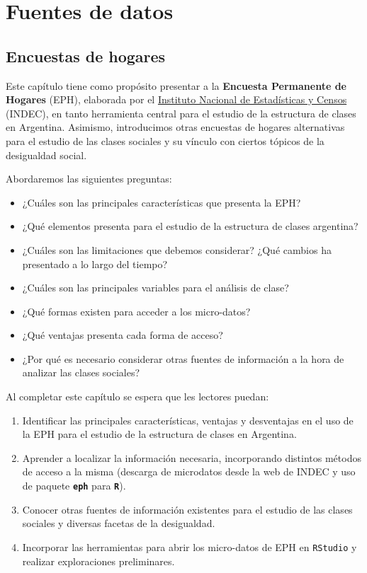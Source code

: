 \documentclass[
]{book}
\providecommand{\tightlist}{%
  \setlength{\itemsep}{0pt}\setlength{\parskip}{0pt}}
\begin{document}
\hypertarget{part-fuentes-de-datos}{%
\part{Fuentes de datos}\label{part-fuentes-de-datos}}

\hypertarget{fuentes}{%
\chapter{Encuestas de hogares}\label{fuentes}}

Este capítulo tiene como propósito presentar a la \textbf{Encuesta Permanente de Hogares} (EPH), elaborada por el \href{www.indec.gob.ar}{Instituto Nacional de Estadísticas y Censos} (INDEC), en tanto herramienta central para el estudio de la estructura de clases en Argentina. Asimismo, introducimos otras encuestas de hogares alternativas para el estudio de las clases sociales y su vínculo con ciertos tópicos de la desigualdad social.

Abordaremos las siguientes preguntas:

\begin{itemize}
\tightlist
\item
  ¿Cuáles son las principales características que presenta la EPH?
\item
  ¿Qué elementos presenta para el estudio de la estructura de clases argentina?
\item
  ¿Cuáles son las limitaciones que debemos considerar? ¿Qué cambios ha presentado a lo largo del tiempo?
\item
  ¿Cuáles son las principales variables para el análisis de clase?
\item
  ¿Qué formas existen para acceder a los micro-datos?
\item
  ¿Qué ventajas presenta cada forma de acceso?
\item
  ¿Por qué es necesario considerar otras fuentes de información a la hora de analizar las clases sociales?
\end{itemize}

Al completar este capítulo se espera que les lectores puedan:

\begin{enumerate}
\def\labelenumi{\arabic{enumi}.}
\tightlist
\item
  Identificar las principales características, ventajas y desventajas en el uso de la EPH para el estudio de la estructura de clases en Argentina.
\item
  Aprender a localizar la información necesaria, incorporando distintos métodos de acceso a la misma (descarga de microdatos desde la web de INDEC y uso de paquete \textbf{\texttt{eph}} para \textbf{\texttt{R}}).
\item
  Conocer otras fuentes de información existentes para el estudio de las clases sociales y diversas facetas de la desigualdad.
\item
  Incorporar las herramientas para abrir los micro-datos de EPH en \texttt{RStudio} y realizar exploraciones preliminares.
\end{enumerate}
\end{document}
